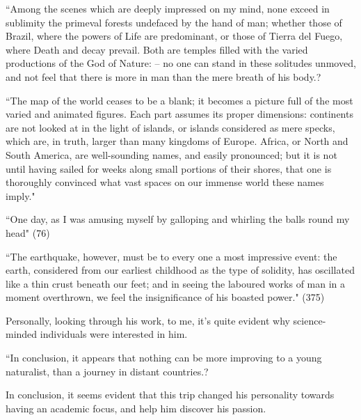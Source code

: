 \documentclass[11pt, oneside]{article}
\begin{document}

``Among the scenes which are deeply impressed on my mind, none exceed in sublimity the primeval forests undefaced by the hand of man; whether those of Brazil, where the powers of Life are predominant, or those of Tierra del Fuego, where Death and decay prevail. Both are temples filled with the varied productions of the God of Nature: -- no one can stand in these solitudes unmoved, and not feel that there is more in man than the mere breath of his body.? 

``The map of the world ceases to be a blank; it becomes a picture full of the most varied and animated figures. Each part assumes its proper dimensions: continents are not looked at in the light of islands, or islands considered as mere specks, which are, in truth, larger than many kingdoms of Europe. Africa, or North and South America, are well-sounding names, and easily pronounced; but it is not until having sailed for weeks along small portions of their shores, that one is thoroughly convinced what vast spaces on our immense world these names imply."


``One day, as I was amusing myself by galloping and whirling the balls round my head" (76)

``The earthquake, however, must be to every one a most impressive event: the earth, considered from our earliest childhood as the type of solidity, has oscillated like a thin crust beneath our feet; and in seeing the laboured works of man in a moment overthrown, we feel the insignificance of his boasted power." (375)


Personally, looking through his work, to me, it's quite evident why science-minded individuals were interested in him. 

``In conclusion, it appears that nothing can be more improving to a young naturalist, than a journey in distant countries.? 

\par In conclusion, it seems evident that this trip changed his personality towards having an academic focus, and help him discover his passion. 
\end{document}
